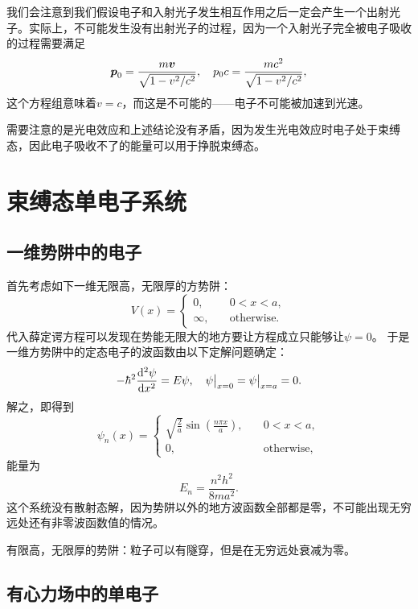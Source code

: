\documentclass[UTF8, a4paper]{ctexart}
\begin{document}
我们会注意到我们假设电子和入射光子发生相互作用之后一定会产生一个出射光子。实际上，不可能发生没有出射光子的过程，因为一个入射光子完全被电子吸收的过程需要满足
\[
    \vb*{p}_0 = \frac{m \vb*{v}}{\sqrt{1 - v^2/c^2}}, \quad p_0 c = \frac{m c^2}{\sqrt{1 - v^2 / c^2}},
\]
这个方程组意味着$v=c$，而这是不可能的——电子不可能被加速到光速。

需要注意的是光电效应和上述结论没有矛盾，因为发生光电效应时电子处于束缚态，因此电子吸收不了的能量可以用于挣脱束缚态。

\section{束缚态单电子系统}

\subsection{一维势阱中的电子}

首先考虑如下一维无限高，无限厚的方势阱：
\begin{equation}
    V(x) = \begin{cases}
        0, \quad &0 < x < a, \\
        \infty, \quad &\text{otherwise}.
    \end{cases}
\end{equation}
代入薛定谔方程可以发现在势能无限大的地方要让方程成立只能够让$\psi=0$。
于是一维方势阱中的定态电子的波函数由以下定解问题确定：
\[
    - \hbar^2 \dv[2]{\psi}{x} = E \psi, \quad \psi\big|_{x=0} = \psi\big|_{x=a} = 0.
\]
解之，即得到
\begin{equation}
    \psi_n(x) = \begin{cases}
        \sqrt{\frac{2}{a}} \sin(\frac{n \pi x}{a}), \quad &0 < x < a, \\
        0, \quad &\text{otherwise},
    \end{cases}
\end{equation}
能量为
\begin{equation}
    E_n = \frac{n^2 h^2}{8 m a^2}.
\end{equation}
这个系统没有散射态解，因为势阱以外的地方波函数全部都是零，不可能出现无穷远处还有非零波函数值的情况。

有限高，无限厚的势阱：粒子可以有隧穿，但是在无穷远处衰减为零。

\subsection{有心力场中的单电子}
\end{document}
